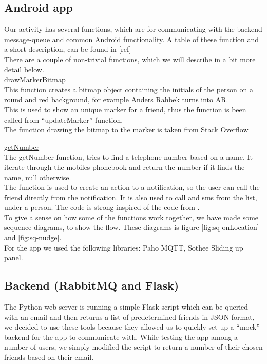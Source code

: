 \documentclass[runningheads,a4paper]{llncs}
\begin{document}
\subsection{Android app}
Our activity has several functions, which are for communicating with the backend message-queue and common Android functionality. A table of these function and a short description, can be found in [ref] \\
There are a couple of non-trivial functions, which we will describe in a bit more detail below.\\

\underline{drawMarkerBitmap}\\
This function creates a bitmap object containing the initials of the person on a round and red background, for example Anders Rahbek turns into AR.\\

This is used to show an unique marker for a friend, thus the function is been called from “updateMarker” function. \\
The function drawing the bitmap to the marker is taken from Stack Overflow\cite{bitmapstackoverflow}

\underline{getNumber}\\
The getNumber function, tries to find a telephone number based on a name. It iterate through the mobiles phonebook and return the number if it finds the name, null otherwise. \\

The function is used to create an action to a notification, so the user can call the friend directly from the notification. It is also used to call and sms from the list, under a person. 
The code is strong inspired of the code from \cite{number}.\\


To give a sense on how some of the functions work together, we have made some sequence diagrams, to show the flow. These diagrams is figure \ref{fig:sq-onLocation} and \ref{fig:sq-nudge}.\\ 

For the app we used the following libraries: Paho MQTT\cite{paho}, Sothee Sliding up panel\cite{slidinguppanel}.


\subsection{Backend (RabbitMQ and Flask)}
The Python web server is running a simple Flask\cite{flask} script which can be queried with an email and then returns a list of predetermined friends in JSON format, we decided to use these tools because they allowed us to quickly set up a “mock” backend for the app to communicate with. While testing the app among a number of users, we simply modified the script to return a number of their chosen friends based on their email.\\
\end{document}
